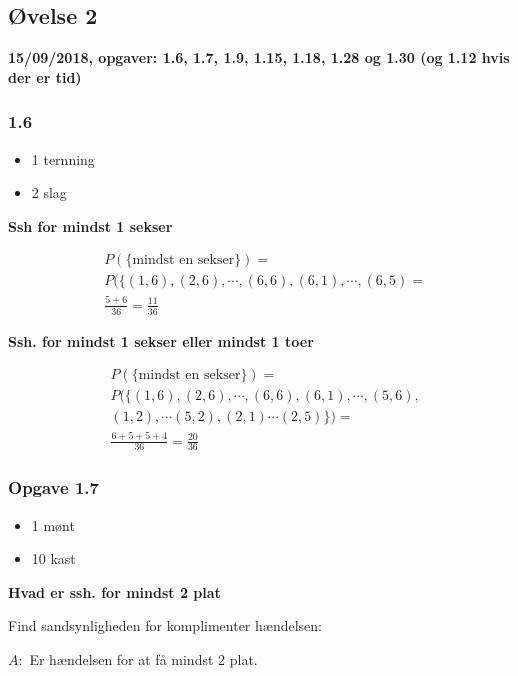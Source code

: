 \horizline

\subsection{Øvelse 2}

\textbf{15/09/2018, opgaver: 1.6, 1.7, 1.9, 1.15, 1.18, 1.28 og 1.30 (og 1.12 hvis der er tid)}

\subsubsection{1.6}
\begin{itemize}
    \item 1 ternning
    \item 2 slag
\end{itemize}

\textbf{Ssh for mindst 1 sekser}

\begin{align}
    &P(\{\text{mindst en sekser}\}) = \\
    &P(\{(1,6),(2,6),\cdots,(6,6),(6,1),\cdots, (6,5) = \\
    &\frac{5 + 6}{36} = \frac{11}{36}
\end{align}

\textbf{Ssh. for mindst 1 sekser eller mindst 1 toer}

\begin{align}
    &P(\{\text{mindst en sekser} \}) = \\
    &P(\{(1,6),(2,6),\cdots,(6,6),(6,1),\cdots,(5,6), \\
    &(1,2),\cdots(5,2),(2,1)\cdots(2,5) \}) = \\
    &\frac{6+5+5+4}{36} = \frac{20}{36}
\end{align}

\subsubsection{Opgave 1.7}

\begin{itemize}
    \item 1 mønt
    \item 10 kast
\end{itemize}

\textbf{Hvad er ssh. for mindst 2 plat}

Find sandsynligheden for komplimenter hændelsen: 

$A:$ Er hændelsen for at få mindst 2 plat.

